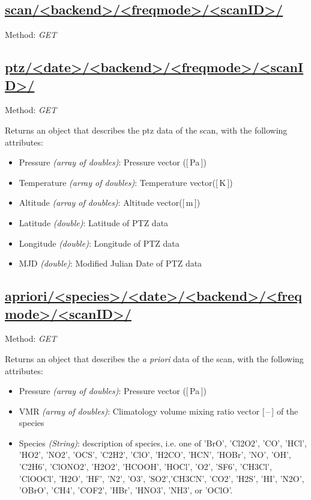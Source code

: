\subsection{\url{scan/<backend>/<freqmode>/<scanID>/}}
Method: \emph{GET}

\subsection{\url{ptz/<date>/<backend>/<freqmode>/<scanID>/}}
Method: \emph{GET}

Returns an object that describes the ptz data of the scan,
with the following attributes:

\begin{itemize}
    \item Pressure \emph{(array of doubles)}: Pressure vector ([\,Pa\,])
    \item Temperature \emph{(array of doubles)}: Temperature vector([\,K\,])
    \item Altitude \emph{(array of doubles)}:  Altitude vector([\,m\,])
    \item Latitude \emph{(double)}: Latitude of PTZ data
    \item Longitude \emph{(double)}: Longitude of PTZ data
    \item MJD \emph{(double)}: Modified Julian Date of PTZ data

\end{itemize}

\subsection{\url{apriori/<species>/<date>/<backend>/<freqmode>/<scanID>/}}
Method: \emph{GET}

Returns an object that describes the \textit{a priori} data of the scan,
with the following attributes:

\begin{itemize}
    \item Pressure \emph{(array of doubles)}: Pressure vector ([\,Pa\,])
    \item VMR \emph{(array of doubles)}: Climatology volume mixing ratio vector [\,--\,] of the species
    \item Species \emph{(String)}: description of species, i.e. one of 'BrO', 'Cl2O2', 'CO',
          'HCl', 'HO2', 'NO2', 'OCS', 'C2H2', 'ClO', 'H2CO', 'HCN', 'HOBr', 'NO', 'OH', 'C2H6',
          'ClONO2', 'H2O2', 'HCOOH', 'HOCl', 'O2', 'SF6', 'CH3Cl', 'ClOOCl', 'H2O', 'HF', 'N2', 'O3',
          'SO2','CH3CN', 'CO2', 'H2S', 'HI', 'N2O', 'OBrO', 'CH4', 'COF2', 'HBr', 'HNO3', 'NH3', or 'OClO'.
\end{itemize}



